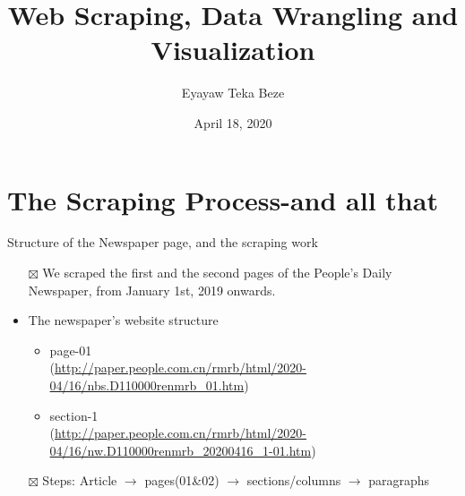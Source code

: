 \documentclass[
  10pt,
  ignorenonframetext,
]{beamer}
\title{Web Scraping, Data Wrangling and Visualization}
\author{Eyayaw Teka Beze}
\date{April 18, 2020}
\begin{document}
\frame{\titlepage}

\begin{frame}[allowframebreaks]
  \tableofcontents[hideallsubsections]
\end{frame}
\hypertarget{the-scraping-process-and-all-that}{%
\section{The Scraping Process-and all
that}\label{the-scraping-process-and-all-that}}

\begin{frame}{Structure of the Newspaper page, and the scraping work}
\protect\hypertarget{structure-of-the-newspaper-page-and-the-scraping-work}{}
\begin{itemize}
\item[$\boxtimes$]
  We scraped the first and the second pages of the People's Daily
  Newspaper, from January 1st, 2019 onwards.
\item
  The newspaper's website structure

  \begin{itemize}
  \item
    page-01\\
    (\url{http://paper.people.com.cn/rmrb/html/2020-04/16/nbs.D110000renmrb_01.htm})
  \item
    section-1\\
    (\url{http://paper.people.com.cn/rmrb/html/2020-04/16/nw.D110000renmrb_20200416_1-01.htm})
  \end{itemize}
\item[$\boxtimes$]
  Steps: Article \(\rightarrow{}\) pages(01\&02) \(\rightarrow\)
  sections/columns \(\rightarrow\) paragraphs
\end{itemize}
\end{frame}
\end{document}
